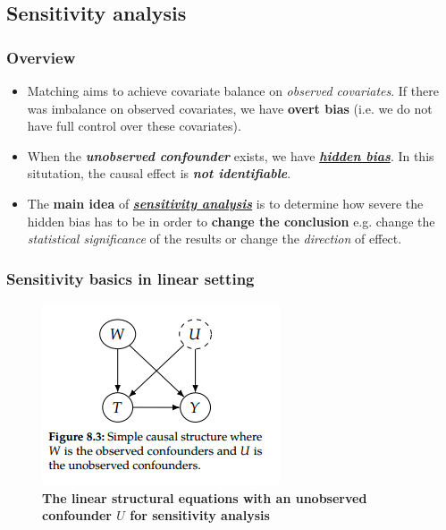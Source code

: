 \documentclass[11pt]{article}
\begin{document}
\subsection{Sensitivity analysis}
\subsubsection{Overview}
\begin{itemize}
\item Matching aims to achieve covariate balance on \emph{observed covariates}. If there was imbalance on observed covariates, we have \textbf{overt bias} (i.e. we do not have full control over these covariates). 

\item When the  \textbf{\emph{unobserved confounder}}  exists, we have \underline{\textbf{\emph{hidden bias}}}. In
this situtation, the causal effect is \emph{\textbf{not identifiable}}.

\item The \textbf{main idea} of \underline{\emph{\textbf{sensitivity analysis}}} is to determine how severe the hidden bias has to be in order to \textbf{change the conclusion} e.g. change the \emph{statistical significance} of the results or change the \emph{direction} of effect.
\end{itemize}
\subsubsection{Sensitivity basics in linear setting}
\begin{figure}
\begin{minipage}[t]{1\linewidth}
  \centering
  \centerline{\includegraphics[scale = 0.7]{scm_sensitivity.png}}
\end{minipage}
\caption{\footnotesize{\textbf{The linear structural equations with an unobserved confounder $U$ for sensitivity analysis  \citep{neal2020introduction}}}}
\label{fig: scm_sensitivity}
\end{figure}
\end{document}

